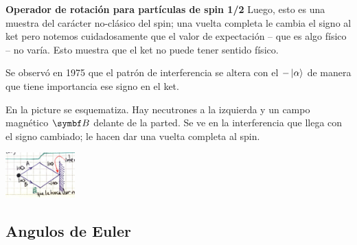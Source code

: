\documentclass[10pt,oneside]{CBFT_book}
\begin{document}
\begin{ejemplo}{\bf Operador de rotación para partículas de spin 1/2}
Luego, esto es una muestra del carácter no-clásico del spin; una vuelta completa le cambia el signo al ket 
pero notemos cuidadosamente que el valor de expectación -- que es algo físico -- no varía. Esto muestra que 
el ket no puede tener sentido físico.

Se observó en 1975 que el patrón de interferencia se altera con el $-\Ket{\alpha}$ de manera que tiene 
importancia ese signo en el ket.

En la picture se esquematiza. Hay necutrones a la izquierda y un campo magnético $\vb B$ delante de la
parted. Se ve en la interferencia que llega con el signo cambiado; le hacen dar una vuelta completa
al spin.

\includegraphics[width=0.20\textwidth]{images/fig_ft2_spin12_rotaciones_experimento.jpg}

\end{ejemplo}

\subsection{Angulos de Euler}
\end{document}

